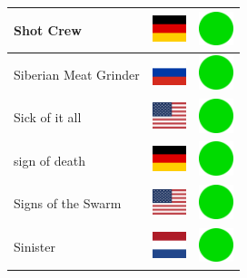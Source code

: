 \documentclass[12pt, a4paper, twoside]{report}
\begin{document}
\begin{center}
\begin{longtable}{|p{5cm}|p{2cm}|p{2cm}|}
 Shot Crew                                                  & \includegraphics[width=1cm]{../4x3/de} &   \includegraphics[width=1cm]{../likes/y} \\ \hline
 Siberian Meat Grinder                                      & \includegraphics[width=1cm]{../4x3/ru} &   \includegraphics[width=1cm]{../likes/y} \\ \hline
 Sick of it all                                             & \includegraphics[width=1cm]{../4x3/us} &   \includegraphics[width=1cm]{../likes/y} \\ \hline
 sign of death                                              & \includegraphics[width=1cm]{../4x3/de} &   \includegraphics[width=1cm]{../likes/y} \\ \hline
 Signs of the Swarm                                         & \includegraphics[width=1cm]{../4x3/us} &   \includegraphics[width=1cm]{../likes/y} \\ \hline
 Sinister                                                   & \includegraphics[width=1cm]{../4x3/nl} &   \includegraphics[width=1cm]{../likes/y} \\ \hline

\end{longtable}
\end{center}
\end{document}
